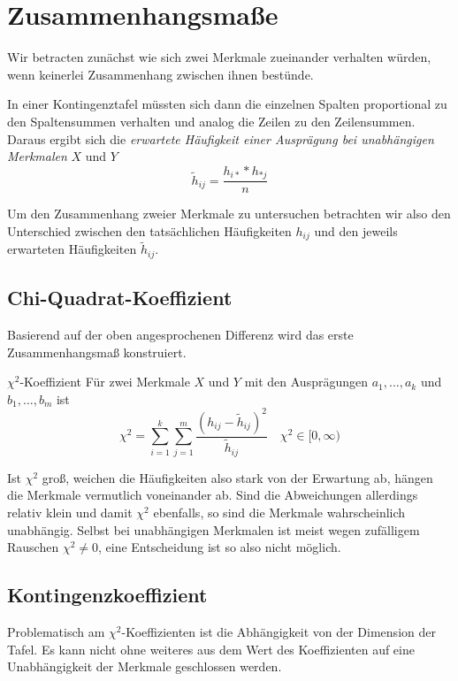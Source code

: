 \section{Zusammenhangsmaße}
Wir betracten zunächst wie sich zwei Merkmale zueinander verhalten würden, wenn keinerlei Zusammenhang zwischen ihnen bestünde.

In einer Kontingenztafel müssten sich dann die einzelnen Spalten proportional zu den Spaltensummen verhalten und analog die Zeilen zu den Zeilensummen.
Daraus ergibt sich die \emph{erwartete Häufigkeit einer Ausprägung bei unabhängigen Merkmalen} $X$ und $Y$
\begin{equation*}
	\tilde h_{ij}=\frac{h_{i*}*h_{*j}}{n}
\end{equation*}

Um den Zusammenhang zweier Merkmale zu untersuchen betrachten wir also den Unterschied zwischen den tatsächlichen Häufigkeiten $h_{ij}$ und den jeweils erwarteten Häufigkeiten $\tilde h_{ij}$.

\subsection{Chi-Quadrat-Koeffizient}
Basierend auf der oben angesprochenen Differenz wird das erste Zusammenhangsmaß konstruiert.
\begin{definition}{$\chi^2$-Koeffizient}
	Für zwei Merkmale $X$ und $Y$ mit den Ausprägungen $a_1,\ldots,a_k$ und $b_1,\ldots,b_m$ ist
	\begin{equation*}
		\chi^2 = \sum\limits_{i=1}^k\sum\limits_{j=1}^m\frac{(h_{ij}-\tilde h_{ij})^2}{\tilde h_{ij}}\quad \chi^2\in[0,\infty)
	\end{equation*}
\end{definition}

Ist $\chi^2$ groß, weichen die Häufigkeiten also stark von der Erwartung ab, hängen die Merkmale vermutlich voneinander ab. Sind die Abweichungen allerdings relativ klein und damit $\chi^2$ ebenfalls, so sind die Merkmale wahrscheinlich unabhängig. Selbst bei unabhängigen Merkmalen ist meist wegen zufälligem Rauschen $\chi^2\neq0$, eine Entscheidung ist so also nicht möglich.

\subsection{Kontingenzkoeffizient}
Problematisch am $\chi^2$-Koeffizienten ist die Abhängigkeit von der Dimension der Tafel. Es kann nicht ohne weiteres aus dem Wert des Koeffizienten auf eine Unabhängigkeit der Merkmale geschlossen werden.

